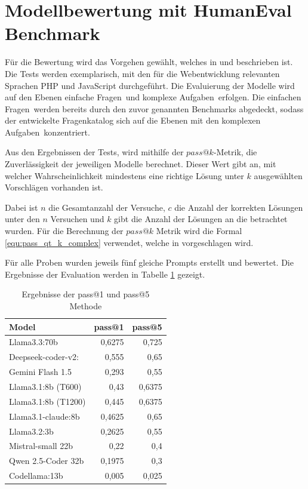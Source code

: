 \section{Modellbewertung mit HumanEval Benchmark}
Für die Bewertung wird das Vorgehen gewählt, welches in \cite{chen-2021} und \cite{peng-2024} beschrieben ist. Die Tests werden exemplarisch, mit den für die Webentwicklung relevanten Sprachen PHP und JavaScript durchgeführt. Die Evaluierung der Modelle wird auf den Ebenen \glqq einfache Fragen\grqq \ und \glqq komplexe Aufgaben\grqq \ erfolgen. Die \glqq einfachen Fragen\grqq \ werden bereits durch den zuvor genannten Benchmarks abgedeckt, sodass der entwickelte Fragenkatalog sich auf die Ebenen mit den \glqq komplexen Aufgaben\grqq \ konzentriert.\vspace{0.2cm}

Aus den Ergebnissen der Tests, wird mithilfe der $pass@k$-Metrik, die Zuverlässigkeit der jeweiligen Modelle berechnet. Dieser Wert gibt an, mit welcher Wahrscheinlichkeit mindestens eine richtige Lösung unter $k$ ausgewählten Vorschlägen vorhanden ist.\vspace{0.2cm}

Dabei ist $n$ die Gesamtanzahl der Versuche, $c$ die Anzahl der korrekten Lösungen unter den $n$ Versuchen und $k$ gibt die Anzahl der Lösungen an die betrachtet wurden. Für die Berechnung der $pass@k$ Metrik wird die Formal \ref{equ:pass_qt_k_complex} verwendet, welche in \cite{chen-2021} vorgeschlagen wird.\vspace{0.2cm}

Für alle Proben wurden jeweils fünf gleiche Prompts erstellt und bewertet. Die Ergebnisse der Evaluation werden in Tabelle \ref{tab:prompt_results_open_models} gezeigt.

\begin{table}[!ht]
	\begin{tabular}{|l|r|r|}
		\hline
		\textbf{Model} & \textbf{pass@1} & \textbf{pass@5} \\
		\hline
		Llama3.3:70b        & 0,6275 &    0,725 \\
		Deepseek-coder-v2:  &  0,555 &     0,65 \\
		Gemini Flash 1.5    &  0,293 &     0,55 \\
		Llama3.1:8b (T600)  &   0,43 &   0,6375 \\
		Llama3.1:8b (T1200) &  0,445 &   0,6375 \\
		Llama3.1-claude:8b  & 0,4625 &     0,65 \\
		Llama3.2:3b         & 0,2625 &     0,55 \\
		Mistral-small 22b   &   0,22 &      0,4 \\
		Qwen 2.5-Coder 32b  & 0,1975 &      0,3 \\
		Codellama:13b       &  0,005 &    0,025 \\
		\hline
		\hline
	\end{tabular}
	\centering
	\label{tab:prompt_results_open_models}
	\caption{Ergebnisse der pass@1 und pass@5 Methode}
\end{table}

